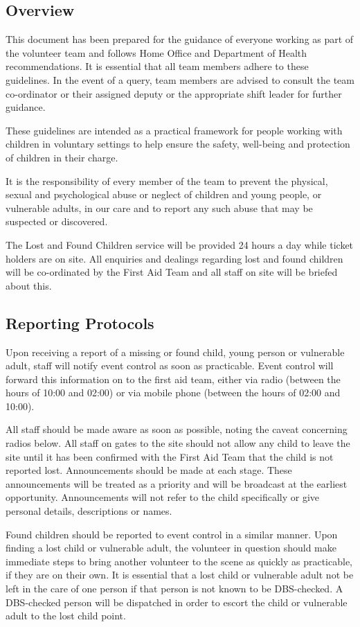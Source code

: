 \subsection{Overview}
This document has been prepared for the guidance of everyone working as
part of the volunteer team and follows Home Office and Department of
Health recommendations. It is essential that all team members adhere to these
guidelines. In the event of a query, team members are advised to consult the
team co-ordinator or their assigned deputy or the appropriate shift leader for
further guidance.

These guidelines are intended as a practical framework for people working with
children in voluntary settings to help ensure the safety, well-being and
protection of children in their charge.

It is the responsibility of every member of the team to prevent
the physical, sexual and psychological abuse or neglect of children and young
people, or vulnerable adults, in our care and to report any such abuse that may
be suspected or discovered.

The Lost and Found Children service will be provided 24 hours a day while
ticket holders are on site. All enquiries and dealings regarding lost and found
children will be co-ordinated by the First Aid Team and all staff on site
will be briefed about this.

\subsection{Reporting Protocols}
Upon receiving a report of a missing or found child, young person or vulnerable
adult, staff will notify event control as soon as practicable. Event control will
forward this information on to the first aid team, either via radio (between the hours of
10:00 and 02:00) or via mobile phone (between the hours of 02:00 and 10:00).

All staff should be made aware as soon as possible, noting the
caveat concerning radios below. All staff on gates to the site should not allow
any child to leave the site until it has been confirmed with the First Aid Team
that the child is not reported lost. Announcements should be made at each
stage. These announcements will be treated as a priority and will be broadcast
at the earliest opportunity. Announcements will not refer to the child
specifically or give personal details, descriptions or names.

Found children should be reported to event control in a similar manner. Upon
finding a lost child or vulnerable adult, the volunteer in question should make
immediate steps to bring another volunteer to the scene as quickly as
practicable, if they are on their own. It is essential that a lost child or
vulnerable adult not be left in the care of one person if that person is not
known to be DBS-checked. A DBS-checked person will be dispatched in order to
escort the child or vulnerable adult to the lost child point.

